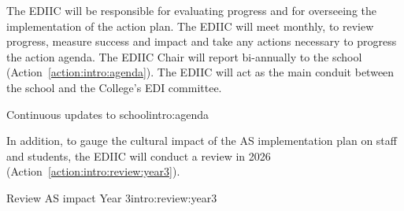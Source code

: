 The EDIIC will be responsible for evaluating progress and for overseeing the implementation of the action plan.
The EDIIC will meet monthly, to review progress, measure success and impact and take any actions necessary to progress the action agenda. The EDIIC Chair will report bi-annually to the school (Action~\ref{action:intro:agenda}).
The EDIIC will act as the main conduit between the school and  the College's EDI committee.



\begin{actionblock}{\ksspace{}Continuous updates to school}{intro:agenda}
\actintroagenda
\hfill{
    \hypersetup{hidelinks}
    \hyperlink{a5}{\gotoactionsymbol{}}
}
\end{actionblock}




In addition, to gauge the cultural impact of the AS implementation plan on staff and students, the EDIIC will conduct a review in 2026
(Action~\ref{action:intro:review:year3}).

\begin{actionblock}{\ksspace{}Review AS impact Year 3}{intro:review:year3}
\actreviewimpactyearthree
\hfill{
    \hypersetup{hidelinks}
    \hyperlink{a6}{\gotoactionsymbol{}}
}
\end{actionblock}





